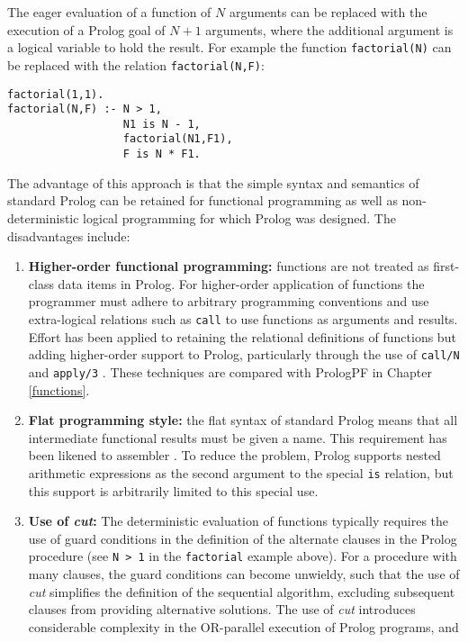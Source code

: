 The eager evaluation of a function of $N$ arguments can be replaced with the
execution of a Prolog goal of $N+1$ arguments,
where the additional argument is a logical variable to hold the
result.  For example the function \texttt{factorial(N)} can be
replaced with the relation \texttt{factorial(N,F)}:
\begin{verbatim}
factorial(1,1).
factorial(N,F) :- N > 1,
                  N1 is N - 1,
                  factorial(N1,F1),
                  F is N * F1.
\end{verbatim}
The advantage of this approach is that the simple syntax and semantics of standard
Prolog can be retained for functional programming as well as non-deterministic logical
programming for which Prolog was designed.  The disadvantages include:
\begin{enumerate}
\item{\textbf{Higher-order functional programming:}  functions are not treated as
  first-class data items in Prolog.  For higher-order application of functions the
  programmer must adhere to arbitrary programming conventions and use extra-logical
  relations such as \texttt{call} to use functions as arguments and results.  Effort
  has been applied to retaining the relational definitions of functions but adding
  higher-order support to Prolog, particularly through the use of \texttt{call/N}
  \cite{SHC95,Nai96} and \texttt{apply/3} \cite{Nai96}.  These techniques are
  compared with PrologPF in Chapter \ref{functions}.}
\item{\textbf{Flat programming style:} the flat syntax of standard Prolog means that
  all intermediate functional results must be given a name.  This requirement has
  been likened to assembler \cite{App92}.  To reduce the problem, Prolog supports
  nested arithmetic expressions as the second argument to the special \texttt{is}
  relation, but this support is arbitrarily limited to this special use.}
\item{\textbf{Use of \textit{cut}:} The deterministic evaluation of functions typically
  requires the use of guard conditions in the definition of the alternate clauses in the
  Prolog procedure (see \texttt{N > 1} in the \texttt{factorial} example above).  For a
  procedure with many clauses, the guard conditions can become unwieldy, such that the
  use of \textit{cut} simplifies the definition of the sequential algorithm, excluding
  subsequent clauses from providing alternative solutions.  The use of \textit{cut}
  introduces considerable complexity in the OR-parallel execution of Prolog programs, and
}
\end{enumerate}
